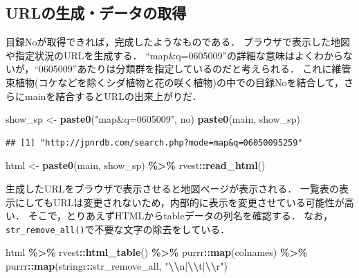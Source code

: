 \documentclass[
]{article}
\newenvironment{Shaded}{\begin{snugshade}}{\end{snugshade}}
\newcommand{\FunctionTok}[1]{\textcolor[rgb]{0.13,0.29,0.53}{\textbf{#1}}}
\newcommand{\NormalTok}[1]{#1}
\newcommand{\OtherTok}[1]{\textcolor[rgb]{0.56,0.35,0.01}{#1}}
\newcommand{\SpecialCharTok}[1]{\textcolor[rgb]{0.81,0.36,0.00}{\textbf{#1}}}
\newcommand{\StringTok}[1]{\textcolor[rgb]{0.31,0.60,0.02}{#1}}
\begin{document}
\hypertarget{urlux306eux751fux6210ux30c7ux30fcux30bfux306eux53d6ux5f97}{%
\subsection{URLの生成・データの取得}\label{urlux306eux751fux6210ux30c7ux30fcux30bfux306eux53d6ux5f97}}

目録Noが取得できれば，完成したようなものである．
ブラウザで表示した地図や指定状況のURLを生成する．
``map\&q=0605009''の詳細な意味はよくわからないが，``0605009''あたりは分類群を指定しているのだと考えられる．
これに維管束植物(コケなどを除くシダ植物と花の咲く植物)の中での目録Noを結合して，さらにmainを結合するとURLの出来上がりだ．

\begin{Shaded}
\begin{Highlighting}[]
\NormalTok{show\_sp }\OtherTok{\textless{}{-}} \FunctionTok{paste0}\NormalTok{(}\StringTok{"map\&q=0605009"}\NormalTok{, no)}
\FunctionTok{paste0}\NormalTok{(main, show\_sp)}
\end{Highlighting}
\end{Shaded}

\begin{verbatim}
## [1] "http://jpnrdb.com/search.php?mode=map&q=06050095259"
\end{verbatim}

\begin{Shaded}
\begin{Highlighting}[]
\NormalTok{html }\OtherTok{\textless{}{-}} 
  \FunctionTok{paste0}\NormalTok{(main, show\_sp) }\SpecialCharTok{\%\textgreater{}\%}
\NormalTok{  rvest}\SpecialCharTok{::}\FunctionTok{read\_html}\NormalTok{()}
\end{Highlighting}
\end{Shaded}

生成したURLをブラウザで表示させると地図ページが表示される．
一覧表の表示にしてもURLは変更されないため，内部的に表示を変更させている可能性が高い．
そこで，とりあえずHTMLからtableデータの列名を確認する．
なお，\texttt{str\_remove\_all()}で不要な文字の除去をしている．

\begin{Shaded}
\begin{Highlighting}[]
\NormalTok{html }\SpecialCharTok{\%\textgreater{}\%}
\NormalTok{  rvest}\SpecialCharTok{::}\FunctionTok{html\_table}\NormalTok{() }\SpecialCharTok{\%\textgreater{}\%}
\NormalTok{  purrr}\SpecialCharTok{::}\FunctionTok{map}\NormalTok{(colnames) }\SpecialCharTok{\%\textgreater{}\%}
\NormalTok{  purrr}\SpecialCharTok{::}\FunctionTok{map}\NormalTok{(stringr}\SpecialCharTok{::}\NormalTok{str\_remove\_all, }\StringTok{"}\SpecialCharTok{\textbackslash{}\textbackslash{}}\StringTok{n|}\SpecialCharTok{\textbackslash{}\textbackslash{}}\StringTok{t|}\SpecialCharTok{\textbackslash{}\textbackslash{}}\StringTok{r"}\NormalTok{)}
\end{Highlighting}
\end{Shaded}
\end{document}
